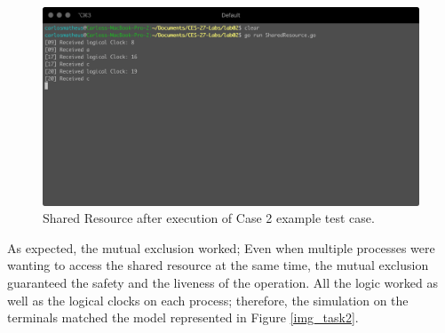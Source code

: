 \documentclass[a4paper, 11pt]{article}
\begin{document}
\begin{figure}[h]
  \begin{center}
  \includegraphics[width=4.5in]{./imgs/case2CS.png}
  \caption{Shared Resource after execution of Case 2 example test case.}
  \label{img_task2_example_window6}
  \end{center}
\end{figure}

As expected, the mutual exclusion worked; Even when multiple processes were wanting to access the shared resource at the same time, the mutual exclusion guaranteed the safety and the liveness of the operation. All the logic worked as well as the logical clocks on each process; therefore, the simulation on the terminals matched the model represented in Figure \ref{img_task2}.
\end{document}
